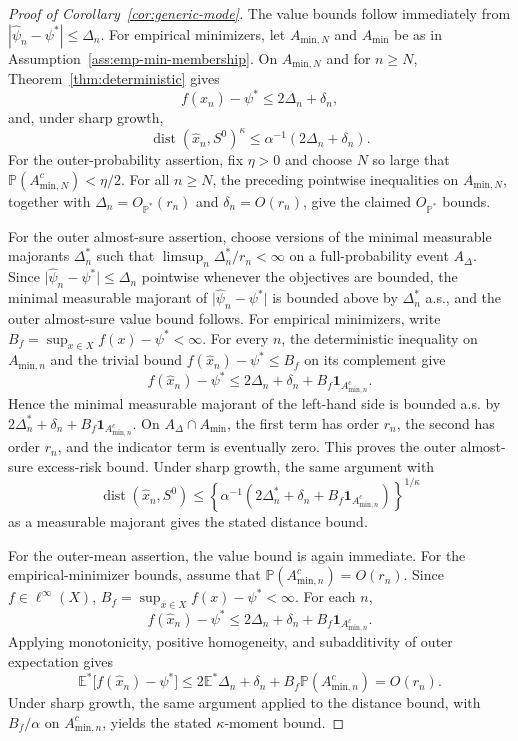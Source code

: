 \documentclass[10pt,a4paper]{amsart}
\begin{document}
\begin{proof}[Proof of Corollary~\ref{cor:generic-mode}]
The value bounds follow immediately from
$|\hat{\psi}_{n}-\psi^{*}|\le\Delta_{n}$. For empirical minimizers, let
$A_{\mathrm{min},N}$ and $A_{\mathrm{min}}$ be as in
Assumption~\ref{ass:emp-min-membership}. On $A_{\mathrm{min},N}$ and for
$n\ge N$, Theorem~\ref{thm:deterministic} gives
\[
f(\hat{x}_{n})-\psi^{*}\le2\Delta_{n}+\delta_{n},
\]
and, under sharp growth,
\[
\operatorname{dist}(\hat{x}_{n},S^{0})^{\kappa}
\le\alpha^{-1}(2\Delta_{n}+\delta_{n}).
\]
For the outer-probability assertion, fix $\eta>0$ and choose $N$ so large that
$\mathbb{P}(A_{\mathrm{min},N}^{c})<\eta/2$. For all $n\ge N$, the preceding
pointwise inequalities on $A_{\mathrm{min},N}$, together with
$\Delta_{n}=O_{\mathbb{P}^{*}}(r_{n})$ and $\delta_{n}=O(r_{n})$, give the
claimed $O_{\mathbb{P}^{*}}$ bounds.

For the outer almost-sure assertion, choose versions of the minimal measurable
majorants $\Delta_{n}^{*}$ such that $\limsup_{n}\Delta_{n}^{*}/r_{n}<\infty$
on a full-probability event $A_{\Delta}$. Since
$\lvert\hat{\psi}_{n}-\psi^{*}\rvert\le\Delta_{n}$ pointwise whenever the
objectives are bounded, the minimal measurable majorant of
$\lvert\hat{\psi}_{n}-\psi^{*}\rvert$ is bounded above by $\Delta_{n}^{*}$
a.s., and the outer almost-sure value bound follows. For empirical minimizers,
write $B_{f}=\sup_{x\in X}f(x)-\psi^{*}<\infty$. For every $n$, the deterministic
inequality on $A_{\mathrm{min},n}$ and the trivial bound
$f(\hat{x}_{n})-\psi^{*}\le B_{f}$ on its complement give
\[
f(\hat{x}_{n})-\psi^{*}\le2\Delta_{n}+\delta_{n}+B_{f}\mathbf{1}_{A_{\mathrm{min},n}^{c}}.
\]
Hence the minimal measurable majorant of the left-hand side is bounded a.s. by
$2\Delta_{n}^{*}+\delta_{n}+B_{f}\mathbf{1}_{A_{\mathrm{min},n}^{c}}$. On
$A_{\Delta}\cap A_{\mathrm{min}}$, the first term has order $r_{n}$, the
second has order $r_{n}$, and the indicator term is eventually zero. This proves
the outer almost-sure excess-risk bound. Under sharp growth, the same argument
with
\[
\operatorname{dist}(\hat{x}_{n},S^{0})\le\left\{\alpha^{-1}\left(2\Delta_{n}^{*}+\delta_{n}+B_{f}\mathbf{1}_{A_{\mathrm{min},n}^{c}}\right)\right\}^{1/\kappa}
\]
as a measurable majorant gives the stated distance bound.

For the outer-mean assertion, the value bound is again immediate. For the
empirical-minimizer bounds, assume that
$\mathbb{P}(A_{\mathrm{min},n}^{c})=O(r_{n})$. Since $f\in\ell^{\infty}(X)$,
$B_{f}=\sup_{x\in X}f(x)-\psi^{*}<\infty$. For each $n$,
\[
f(\hat{x}_{n})-\psi^{*}
\le 2\Delta_{n}+\delta_{n}+B_{f}\mathbf{1}_{A_{\mathrm{min},n}^{c}}.
\]
Applying monotonicity, positive homogeneity, and subadditivity of outer
expectation gives
\[
\mathbb{E}^{*}\bigl[f(\hat{x}_{n})-\psi^{*}\bigr]
\le2\mathbb{E}^{*}\Delta_{n}+\delta_{n}+B_{f}\mathbb{P}(A_{\mathrm{min},n}^{c})=O(r_{n}).
\]
Under sharp growth, the same argument applied to the distance bound, with
$B_{f}/\alpha$ on $A_{\mathrm{min},n}^{c}$, yields the stated
$\kappa$-moment bound.
\end{proof}
\end{document}
